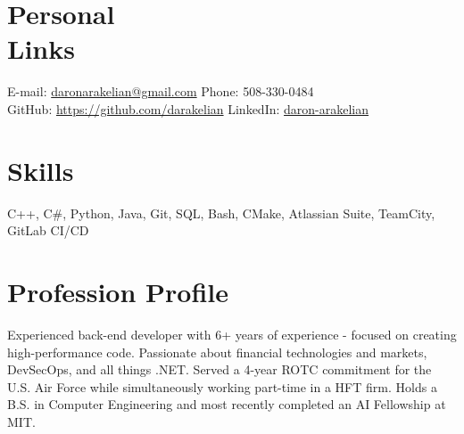 \documentclass[margin,line]{resume}
\begin{document}
\begin{resume}

    \section{\mysidestyle Personal\\Links}
    E-mail: \href{mailto://daronarakelian@gmail.com}{daronarakelian@gmail.com} \hfill Phone: 508-330-0484\vspace{0mm}\\\vspace{0mm}%
    GitHub: \url{https://github.com/darakelian} \hfill LinkedIn: \href{https://www.linkedin.com/in/daron-arakelian-943540194/}{daron-arakelian}\vspace{0mm}\\\vspace{-4.5mm}%

    \section{\mysidestyle Skills} 
    C++, C\#, Python, Java, Git, SQL, Bash, CMake, Atlassian Suite, TeamCity, GitLab CI/CD

    \section{\mysidestyle Profession Profile}
    Experienced back-end developer with 6+ years of experience - focused on creating high-performance code. Passionate about financial technologies and markets, DevSecOps, and all things .NET. Served a 4-year ROTC commitment for the U.S. Air Force while simultaneously working part-time in a HFT firm. Holds a B.S. in Computer Engineering and most recently completed an AI Fellowship at MIT.
  

\end{resume}
\end{document}
